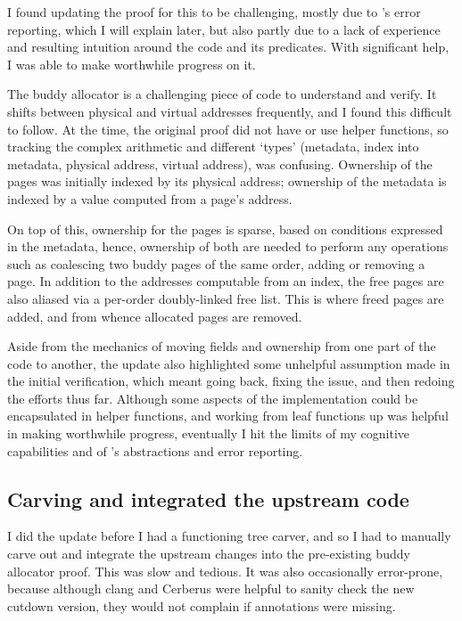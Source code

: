 I found updating the proof for this to be challenging, mostly due to 's
error reporting, which I will explain later, but also partly due to a lack
of experience and resulting intuition around the code and its predicates.
With significant help, I was able to make worthwhile progress on it.

The  buddy allocator is a challenging piece of code to understand and
verify. It shifts between physical and virtual addresses frequently, and I
found this difficult to follow. At the time, the original proof did not have or
use helper functions, so tracking the complex arithmetic and different `types'
(metadata, index into metadata, physical address, virtual address),
was confusing. Ownership of the pages was initially indexed by its physical
address; ownership of the metadata is indexed by a value computed from a page's
address.

On top of this, ownership for the pages is sparse, based on conditions
expressed in the metadata, hence, ownership of both are needed to perform any
operations such as coalescing two buddy pages of the same order, adding or
removing a page. In addition to the addresses computable from an index, the
free pages are also aliased via a per-order doubly-linked free list. This is
where freed pages are added, and from whence allocated pages are removed.

Aside from the mechanics of moving fields and ownership from one part of the
code to another, the update also highlighted some unhelpful assumption made in
the initial verification, which meant going back, fixing the issue, and then
redoing the efforts thus far. Although some aspects of the implementation could
be encapsulated in helper functions, and working from leaf functions up was
helpful in making worthwhile progress, eventually I hit the limits of my
cognitive capabilities and of 's abstractions and error reporting.

\subsection{Carving and integrated the upstream code}
I did the update before I had a functioning tree carver, and so I had to
manually carve out and integrate the upstream changes into the pre-existing
buddy allocator proof. This was slow and tedious. It was also occasionally
error-prone, because although clang and Cerberus were helpful to sanity check
the new cutdown version, they would not complain if annotations were missing.

